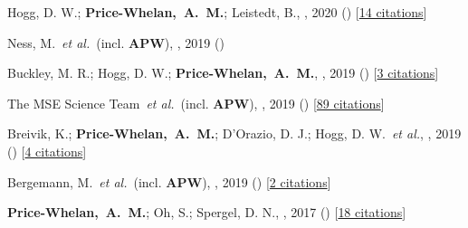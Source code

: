 \item[{\color{deemph}\scriptsize7}]Hogg, D. W.; \textbf{Price-Whelan,~A.~M.}; Leistedt, B., , 2020 () [\href{http://adsabs.harvard.edu/abs/2020arXiv200514199H}{14 citations}]

\item[{\color{deemph}\scriptsize6}]Ness, M.~\textit{et al.}~(incl. \textbf{APW}), , 2019 ()

\item[{\color{deemph}\scriptsize5}]Buckley, M. R.; Hogg, D. W.; \textbf{Price-Whelan,~A.~M.}, , 2019 () [\href{http://adsabs.harvard.edu/abs/2019arXiv190700987B}{3 citations}]

\item[{\color{deemph}\scriptsize4}]The MSE Science Team~\textit{et al.}~(incl. \textbf{APW}), , 2019 () [\href{http://adsabs.harvard.edu/abs/2019arXiv190404907T}{89 citations}]

\item[{\color{deemph}\scriptsize3}]Breivik, K.; \textbf{Price-Whelan,~A.~M.}; D'Orazio, D. J.; Hogg, D. W.~\textit{et al.}, , 2019 () [\href{http://adsabs.harvard.edu/abs/2019arXiv190305094B}{4 citations}]

\item[{\color{deemph}\scriptsize2}]Bergemann, M.~\textit{et al.}~(incl. \textbf{APW}), , 2019 () [\href{http://adsabs.harvard.edu/abs/2019arXiv190303157B}{2 citations}]

\item[{\color{deemph}\scriptsize1}]\textbf{Price-Whelan,~A.~M.}; Oh, S.; Spergel, D. N., , 2017 () [\href{http://adsabs.harvard.edu/abs/2017arXiv170903532P}{18 citations}]